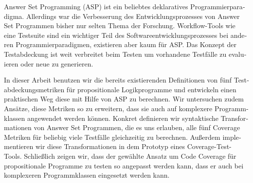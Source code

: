     
 
 
 
    
    \clearpage

    \begin{otherlanguage}{ngerman}
        Answer Set Programming (ASP) ist ein beliebtes deklaratives Programmierparadigma. Allerdings war die Verbesserung des Entwicklungsprozesses von Answer Set Programmen bisher nur selten Thema der Forschung. Workflow-Tools wie eine Testsuite sind ein wichtiger Teil des Softwareentwicklungsprozesses bei anderen Programmierparadigmen, existieren aber kaum für ASP. Das Konzept der Testabdeckung ist weit verbreitet beim Testen um vorhandene Testfälle zu evaluieren oder neue zu generieren.

        In dieser Arbeit benutzen wir die bereits existierenden Definitionen von fünf Testabdeckungsmetriken für propositionale Logikprogramme und entwickeln einen praktischen Weg diese mit Hilfe von ASP zu berechnen. Wir untersuchen zudem Ansätze, diese Metriken so zu erweitern, dass sie auch auf komplexere Programmklassen angewendet werden können. Konkret definieren wir syntaktische Transformationen von Answer Set Programmen, die es uns erlauben, alle fünf Coverage Metriken für beliebig viele Testfälle gleichzeitig zu berechnen. Außerdem implementieren wir diese Transformationen in dem Prototyp eines Coverage-Test-Tools. Schließlich zeigen wir, dass der gewählte Ansatz um Code Coverage für propositionale Programme zu testen so angepasst werden kann, dass er auch bei komplexeren Programmklassen eingesetzt werden kann.
    \end{otherlanguage}

    \vfill
\endgroup

\cleardoublepage




\tableofcontents

\cleardoublepage
